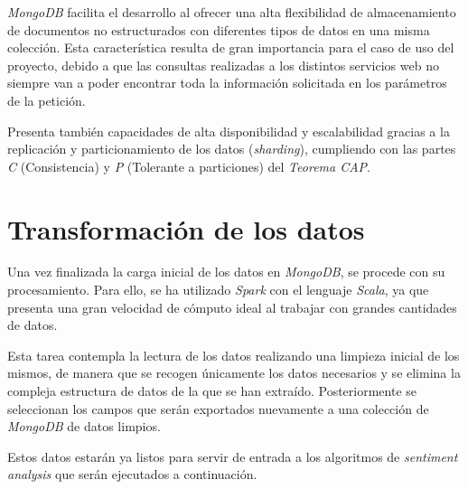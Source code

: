 \textit{MongoDB} facilita el desarrollo al ofrecer una alta flexibilidad de almacenamiento de documentos no estructurados con diferentes tipos de datos en una misma colección. Esta característica resulta de gran importancia para el caso de uso del proyecto, debido a que las consultas realizadas a los distintos servicios web no siempre van a poder encontrar toda la información solicitada en los parámetros de la petición.

Presenta también capacidades de alta disponibilidad y escalabilidad gracias a la replicación y particionamiento de los datos (\textit{sharding}), cumpliendo con las partes \textit{C} (Consistencia) y \textit{P} (Tolerante a particiones) del \textit{Teorema CAP}.

\section{Transformación de los datos}

Una vez finalizada la carga inicial de los datos en \textit{MongoDB}, se procede con su procesamiento. Para ello, se ha utilizado \textit{Spark} con el lenguaje \textit{Scala}, ya que presenta una gran velocidad de cómputo ideal al trabajar con grandes cantidades de datos.

Esta tarea contempla la lectura de los datos realizando una limpieza inicial de los mismos, de manera que se recogen únicamente los datos necesarios y se elimina la compleja estructura de datos de la que se han extraído. Posteriormente se seleccionan los campos que serán exportados nuevamente a una colección de \textit{MongoDB} de datos limpios.

Estos datos estarán ya listos para servir de entrada a los algoritmos de \textit{sentiment analysis} que serán ejecutados a continuación.